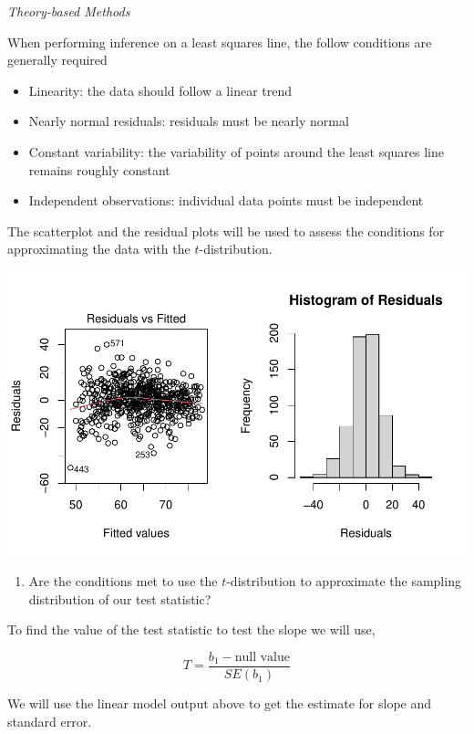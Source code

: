 \documentclass[
]{report}
\providecommand{\tightlist}{%
  \setlength{\itemsep}{0pt}\setlength{\parskip}{0pt}}
\begin{document}
\newpage

\emph{Theory-based Methods}

When performing inference on a least squares line, the follow conditions are generally required

\begin{itemize}
\item
  Linearity: the data should follow a linear trend
\item
  Nearly normal residuals: residuals must be nearly normal
\item
  Constant variability: the variability of points around the least squares line remains roughly constant
\item
  Independent observations: individual data points must be independent
\end{itemize}

The scatterplot and the residual plots will be used to assess the conditions for approximating the data with the \(t\)-distribution.

\begin{center}\includegraphics[width=0.7\linewidth]{14-UR-module13_review_files/figure-latex/unnamed-chunk-7-1} \end{center}

\begin{enumerate}
\def\labelenumi{\arabic{enumi}.}
\setcounter{enumi}{10}
\tightlist
\item
  Are the conditions met to use the \(t\)-distribution to approximate the sampling distribution of our test statistic?
\end{enumerate}

\newpage

To find the value of the test statistic to test the slope we will use,

\[
T = \frac{b_1- \text{null value}}{SE(b_1)}
\]

We will use the linear model output above to get the estimate for slope and standard error.
\end{document}

